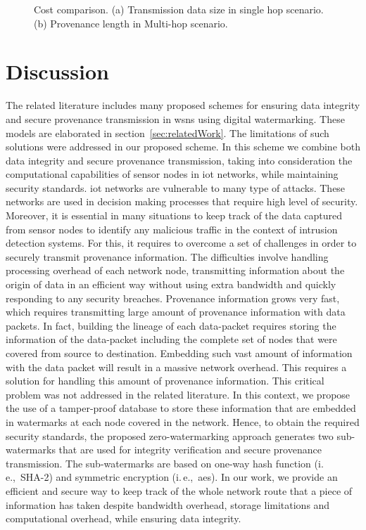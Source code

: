 \documentclass{llncs}
\newcommand{\ie}{i.\,e.,~}
\begin{document}
\begin{figure*}[!htbp]
  \centering
  \hfill
  \caption{Cost comparison. (a) Transmission data size in single hop scenario. (b) Provenance length in Multi-hop scenario.} 
\end{figure*} 



\section{Discussion}
\label{sec:discussion}

The related literature includes many proposed schemes for ensuring data integrity and secure provenance transmission in \gls*{wsn}s using digital watermarking. These models are elaborated in section~\ref{sec:relatedWork}. The limitations of such solutions were addressed in our proposed scheme. In this scheme we combine both data integrity and secure provenance transmission, taking into consideration the computational capabilities of sensor nodes in \gls*{iot} networks, while maintaining security standards. \gls*{iot} networks are vulnerable to many type of attacks. These networks are used in decision making processes that require high level of security. Moreover, it is essential in many situations to keep track of the data captured from sensor nodes to identify any malicious traffic in the context of intrusion detection systems. For this, it requires to overcome a set of challenges in order to securely transmit provenance information. The difficulties involve handling processing overhead of each network node, transmitting information about the origin of data in an efficient way without using extra bandwidth and quickly responding to any security breaches. Provenance information grows very fast, which requires transmitting large amount of provenance information with data packets. In fact, building the lineage of each data-packet requires storing the information of the data-packet including the complete set of nodes that were covered from source to destination. Embedding such vast amount of information with the data packet will result in a massive network overhead. This requires a solution for handling this amount of provenance information. This critical problem was not addressed in the related literature. In this context, we propose the use of a tamper-proof database to store these information that are embedded in watermarks at each node covered in the network. Hence, to obtain the required security standards, the proposed zero-watermarking approach generates two sub-watermarks that are used for integrity verification and secure provenance transmission. The sub-watermarks are based on one-way hash function (\ie SHA-2) and symmetric encryption (\ie \gls*{aes}). In our work, we provide an efficient and secure way to keep track of the whole network route that a piece of information has taken despite bandwidth overhead, storage limitations and computational overhead, while ensuring data integrity.
\end{document}
